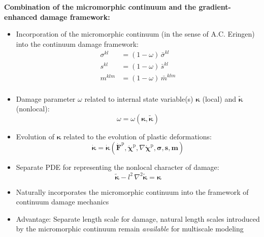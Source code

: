 
\begin{frame}{}
    \textbf{Combination of the micromorphic continuum and the gradient-enhanced damage framework:}
    \begin{itemize}
        \item Incorporation of the micromorphic continuum (in the sense of A.C. Eringen) into the continuum damage framework:
                \begin{align*}
                    \sigma^{kl} &= (1-\omega) \, \bar\sigma^{kl} \\
                    s^{kl} &= (1-\omega) \, \bar{s}^{kl} \\
                    m^{klm} &= (1-\omega) \, \bar{m}^{klm} \\
                \end{align*}
        \item Damage parameter $\omega$ related to internal state variable(s) $\boldsymbol \kappa$ (local) and $\boldsymbol {\tilde\kappa}$ (nonlocal):
                \begin{equation*}
                    \omega = \omega (  \boldsymbol \kappa, \boldsymbol {\tilde\kappa} )
                \end{equation*}
        \item Evolution of $\boldsymbol \kappa$ related to the evolution of plastic deformations:
            \begin{equation*}
                \boldsymbol {\dot \kappa } =  \boldsymbol {\dot \kappa } ( \boldsymbol {\dot F}^\mathrm{p}, \boldsymbol {\dot \chi}^\mathrm{p}, \nabla \boldsymbol {\dot \chi}^\mathrm{p},%
                \boldsymbol \sigma, \boldsymbol s, \boldsymbol {m})
            \end{equation*}
        \item Separate PDE for representing the nonlocal character of damage:
            \begin{equation*}
                {\boldsymbol {\tilde \kappa} - l^2 \, \nabla ^2 \boldsymbol {\tilde\kappa} }= \boldsymbol \kappa
            \end{equation*}
        \item Naturally incorporates the micromorphic continuum into the framework of continuum damage mechanics
        \item Advantage: Separate length scale for damage, natural length scales introduced by the micromorphic continuum remain \emph{available} for multiscale modeling
    \end{itemize}
\end{frame}

